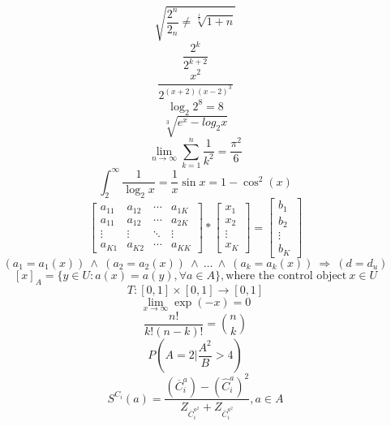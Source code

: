 \documentclass[12pt]{article}
\begin{document}
\maketitle
$$ \sqrt{ \frac{2^{n}}{2_n} \neq \sqrt[\frac{1}{3}]{1+n}} $$
$$ \frac{2^k}{2^{k+2}} $$
$$ \frac{x^2}{2^{(x+2)(x-2)^3}} $$
$$ \log_{2}2^8=8 $$
$$ \sqrt[3]{e^x - log_{2}x} $$
$$ \lim_{n\rightarrow\infty}\sum_{k=1}^{n}\frac{1}{k^2}=\frac{\pi^2}{6} $$
$$ \int_{2}^\infty \frac{1}{\log_{2}x}=\frac{1}{x}\sin{x}=1-\cos^2(x) $$
$$ \left[\begin{array}{cccc}
a_{11} & a_{12} & \cdots & a_{1K}\\
a_{11} & a_{12} & \cdots & a_{2K}\\
\vdots & \vdots & \ddots & \vdots\\
a_{K1} & a_{K2} & \cdots & a_{KK}
\end{array}\right] * \left[\begin{array}{c}
x_1 \\
x_2 \\
\vdots \\
x_K
\end{array}\right] = \left[\begin{array}{c}
b_1 \\
b_2 \\
\vdots \\
b_K
\end{array}\right] $$
$$ (a_1 = a_1(x)) \ \land \ (a_2=a_2(x)) \ \land \ \ldots \ \land \ (a_k=a_k(x)) \ \Rightarrow \ (d=d_u) $$
$$ [x]_A=\{y \in U:a(x) = a(y),\forall a \in A \}, \textrm{where the control object} \ x \in U $$
$$ T:[0,1] \times [0,1] \rightarrow [0,1] $$
$$ \lim_{x\rightarrow\infty}\exp(-x) = 0 $$
$$ \frac{n!}{k!(n-k)!}={n \choose k}$$
$$ P\left( A=2|\frac{A^2}{B} > 4\right) $$
$$ S^{C_i}(a) = \frac{(\overline{C}_i^a)-(\hat{C}_i^a)^2}{Z_{\overline{C}_i^{a^2}}+Z_{\bar{C}_i^{a^2}}}, a \in A $$
\end{document}
